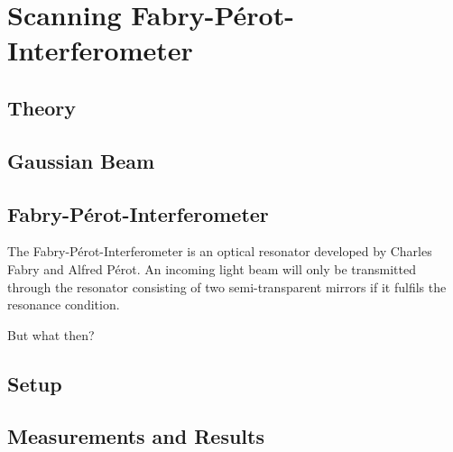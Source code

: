 \chapter{Scanning Fabry-Pérot-Interferometer}

\section{Theory}

\section{Gaussian Beam}

\section{Fabry-Pérot-Interferometer}

The Fabry-Pérot-Interferometer is an optical resonator developed by Charles Fabry and Alfred Pérot.
An incoming light beam will only be transmitted through the resonator consisting of two semi-transparent mirrors if it fulfils the resonance condition.

But what then?

\section{Setup}

\section{Measurements and Results}